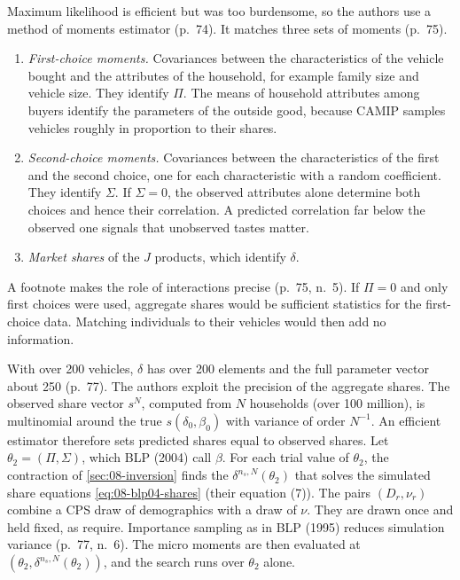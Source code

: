 Maximum likelihood is efficient but was too burdensome, so the authors use a method of moments estimator
(p.~74). It matches three sets of moments (p.~75).
\begin{enumerate}
\item \emph{First-choice moments.} Covariances between the characteristics of the vehicle bought and the
attributes of the household, for example family size and vehicle size. They identify $\Pi$. The means of
household attributes among buyers identify the parameters of the outside good, because CAMIP samples vehicles
roughly in proportion to their shares.
\item \emph{Second-choice moments.} Covariances between the characteristics of the first and the second
choice, one for each characteristic with a random coefficient. They identify $\Sigma$. If $\Sigma = 0$, the
observed attributes alone determine both choices and hence their correlation. A predicted correlation far below
the observed one signals that unobserved tastes matter.
\item \emph{Market shares} of the $J$ products, which identify $\delta$.
\end{enumerate}
A footnote makes the role of interactions precise (p.~75, n.~5). If $\Pi = 0$ and only first choices were
used, aggregate shares would be sufficient statistics for the first-choice data. Matching individuals to their
vehicles would then add no information.

 With over 200 vehicles, $\delta$ has over 200 elements and
the full parameter vector about 250 (p.~77). The authors exploit the precision of the aggregate shares. The
observed share vector $s^N$, computed from $N$ households (over 100 million), is multinomial around the true
$s(\delta_0, \beta_0)$ with variance of order $N^{-1}$. An efficient estimator therefore sets predicted shares
equal to observed shares. Let $\theta_2 = (\Pi, \Sigma)$, which BLP (2004) call $\beta$. For each trial value of
$\theta_2$, the contraction of \cref{sec:08-inversion} finds the $\delta^{n_s,N}(\theta_2)$ that solves the simulated
share equations \eqref{eq:08-blp04-shares} (their equation (7)). The pairs $(D_r, \nu_r)$ combine a CPS draw of
demographics with a draw of $\nu$. They are drawn once and held fixed, as \citet{PakesPollard1989} require. Importance
sampling as in BLP (1995) reduces simulation variance (p.~77, n.~6). The micro moments are then evaluated at
$(\theta_2, \delta^{n_s,N}(\theta_2))$, and the search runs over $\theta_2$ alone.

